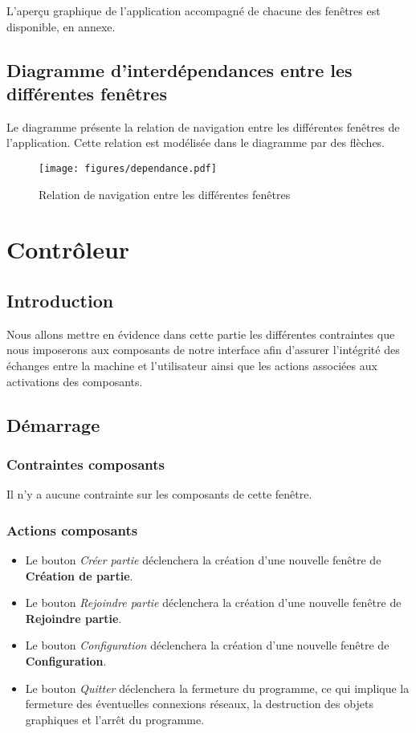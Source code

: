 L'aperçu graphique de l'application accompagné de chacune des fenêtres est 
disponible, en annexe.

\subsection{Diagramme d'interdépendances entre les différentes fenêtres}
Le diagramme présente la relation de navigation entre les différentes fenêtres 
de l'application. Cette relation est modélisée dans le diagramme par des flèches.
\begin{figure}[ht]
	\centering \texttt{[image: figures/dependance.pdf]}
	\caption{Relation de navigation entre les différentes fenêtres}
\end{figure}

\section{Contrôleur}

\subsection{Introduction}
Nous allons mettre en évidence dans cette partie les différentes contraintes 
que nous imposerons aux composants de notre interface afin d'assurer l'intégrité 
des échanges entre la machine et l'utilisateur ainsi que les actions associées 
aux activations des composants. 

\subsection{Démarrage}

\subsubsection{Contraintes composants}

Il n'y a aucune contrainte sur les composants de cette fenêtre.

\subsubsection{Actions composants}

\begin{itemize}
	\item Le bouton \textit{Créer partie} déclenchera la création d'une nouvelle
	      fenêtre de \textbf{Création de partie}.
	\item Le bouton \textit{Rejoindre partie} déclenchera la création d'une 
	      nouvelle fenêtre de \textbf{Rejoindre partie}.
	\item Le bouton \textit{Configuration} déclenchera la création d'une 
	      nouvelle fenêtre de \textbf{Configuration}.
	\item Le bouton \textit{Quitter} déclenchera la fermeture du programme, 
	      ce qui implique la fermeture des éventuelles connexions réseaux, 
	      la destruction des objets graphiques et l'arrêt du programme.
\end{itemize}

